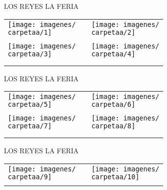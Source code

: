 \documentclass[10pt,letter]{report}
\begin{document}
\renewcommand{\carpetaa}{los_reyes_la_feria}

\begin{center}
	\textcolor{principal}{LOS REYES LA FERIA}
\end{center}
\begin{table}[H]
\centering

\footnotesize
	\begin{tabular}{m{7cm}m{1cm}m{7cm}}
	
	\texttt{[image: imagenes/\\carpetaa/1]}&&\texttt{[image: imagenes/\\carpetaa/2]}
	\\
	\\
	\texttt{[image: imagenes/\\carpetaa/3]}&&\texttt{[image: imagenes/\\carpetaa/4]}\\
	\\
	\\
	
	\end{tabular}
	
\end{table}
\newpage

\begin{center}
	\textcolor{principal}{LOS REYES LA FERIA}
\end{center}
\begin{table}[H]
\centering

\footnotesize
	\begin{tabular}{m{7cm}m{1cm}m{7cm}}
	
	\texttt{[image: imagenes/\\carpetaa/5]}&&\texttt{[image: imagenes/\\carpetaa/6]}
	\\
	\\
	\texttt{[image: imagenes/\\carpetaa/7]}&&\texttt{[image: imagenes/\\carpetaa/8]}\\
	\\
	\\
	
	\end{tabular}
	
\end{table}
\newpage

\begin{center}
	\textcolor{principal}{LOS REYES LA FERIA}
\end{center}
\begin{table}[H]
\centering

\footnotesize
	\begin{tabular}{m{7cm}m{1cm}m{7cm}}
	
	\texttt{[image: imagenes/\\carpetaa/9]}&&\texttt{[image: imagenes/\\carpetaa/10]}
	\\
	\\

	
	\end{tabular}
	
\end{table}
\newpage
\end{document}
